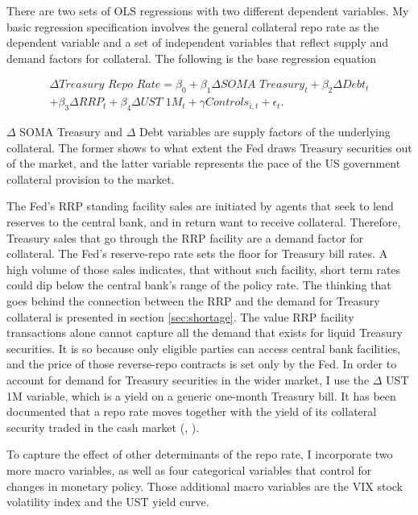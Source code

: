 \documentclass[11pt,a4paper,english,oneside]{article}
\begin{document}
There are two sets of OLS regressions with two different dependent variables. My basic regression specification involves the general collateral repo rate as the dependent variable and a set of independent variables that reflect supply and demand factors for collateral. The following is the base regression equation

\begin{equation} \label{eq:1}
  \begin{gathered}
  \Delta \textit{Treasury Repo Rate} = \beta_0 + \beta_1 \Delta \textit{SOMA Treasury}_t + \beta_2 \Delta \textit{Debt}_t \\ + \beta_3 \Delta \textit{RRP}_t  + \beta_4 \Delta \textit{UST 1M}_t + \gamma \textit{Controls}_{i,t} + \epsilon_{t}.
  \end{gathered}
\end{equation}

$\Delta$ SOMA Treasury and $\Delta$ Debt variables are supply factors of the underlying collateral. The former shows to what extent the Fed draws Treasury securities out of the market, and the latter variable represents the pace of the US government collateral provision to the market.

The Fed's RRP standing facility sales are initiated by agents that seek to lend reserves to the central bank, and in return want to receive collateral. Therefore, Treasury sales that go through the RRP facility are a demand factor for collateral. The Fed's reserve-repo rate sets the floor for Treasury bill rates. A high volume of those sales indicates, that without such facility, short term rates could dip below the central bank's range of the policy rate. The thinking that goes behind the connection between the RRP and the demand for Treasury collateral is presented in section \ref{sec:shortage}.
The value RRP facility transactions alone cannot capture all the demand that exists for liquid Treasury securities. It is so because only eligible parties can access central bank facilities, and the price of those reverse-repo contracts is set only by the Fed. In order to account for demand for Treasury securities in the wider market, I use the $\Delta$ UST 1M variable, which is a yield on a generic one-month Treasury bill. It has been documented that a repo rate moves together with the yield of its collateral security traded in the cash market (\citep{bartolini2011}, \citep{nyborg2019a}).

To capture the effect of other determinants of the repo rate, I incorporate two more macro variables, as well as four categorical variables that control for changes in monetary policy. Those additional macro variables are the VIX stock volatility index and the UST yield curve.
\end{document}

